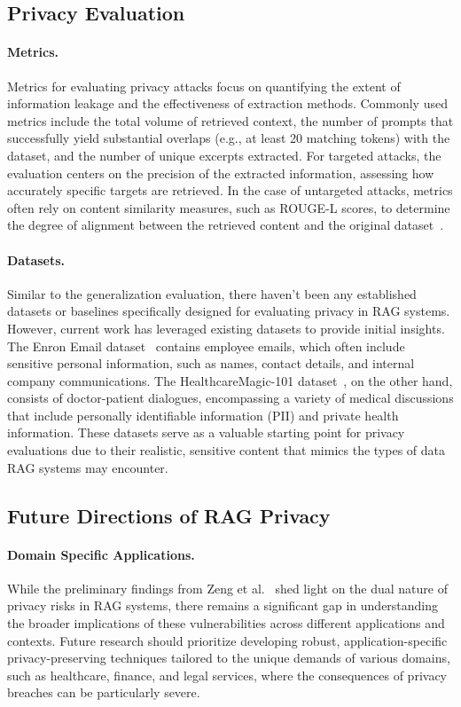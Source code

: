 \subsection{Privacy Evaluation}
\paragraph{Metrics.} Metrics for evaluating privacy attacks focus on quantifying the extent of information leakage and the effectiveness of extraction methods. Commonly used metrics include the total volume of retrieved context, the number of prompts that successfully yield substantial overlaps (e.g., at least 20 matching tokens) with the dataset, and the number of unique excerpts extracted. For targeted attacks, the evaluation centers on the precision of the extracted information, assessing how accurately specific targets are retrieved. In the case of untargeted attacks, metrics often rely on content similarity measures, such as ROUGE-L scores, to determine the degree of alignment between the retrieved content and the original dataset~\cite{privacy_rag_2024, zeng2024mitigating}.

\paragraph{Datasets.} Similar to the generalization evaluation, there haven't been any established datasets or baselines specifically designed for evaluating privacy in RAG systems. However, current work has leveraged existing datasets to provide initial insights. The Enron Email dataset~\cite{klimt2004enron} contains employee emails, which often include sensitive personal information, such as names, contact details, and internal company communications. The HealthcareMagic-101 dataset~\cite{zeng2024mitigating}, on the other hand, consists of doctor-patient dialogues, encompassing a variety of medical discussions that include personally identifiable information (PII) and private health information. These datasets serve as a valuable starting point for privacy evaluations due to their realistic, sensitive content that mimics the types of data RAG systems may encounter.

\subsection{Future Directions of RAG Privacy}
\paragraph{Domain Specific Applications.} While the preliminary findings from Zeng et al.~\cite{privacy_rag_2024} shed light on the dual nature of privacy risks in RAG systems, there remains a significant gap in understanding the broader implications of these vulnerabilities across different applications and contexts. Future research should prioritize developing robust, application-specific privacy-preserving techniques tailored to the unique demands of various domains, such as healthcare, finance, and legal services, where the consequences of privacy breaches can be particularly severe.

